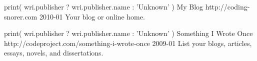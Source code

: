 


\begin{cventries}

  \cventry
    {
    print( wri.publisher ? wri.publisher.name : 'Unknown' )
    } %
    {My Blog} %
    {http://coding-snorer.com} %
    {2010-01} %
    {Your blog or online home.} %


  \cventry
    {
    print( wri.publisher ? wri.publisher.name : 'Unknown' )
    } %
    {Something I Wrote Once} %
    {http://codeproject.com/something-i-wrote-once} %
    {2009-01} %
    {List your blogs, articles, essays, novels, and dissertations.} %


\end{cventries}

